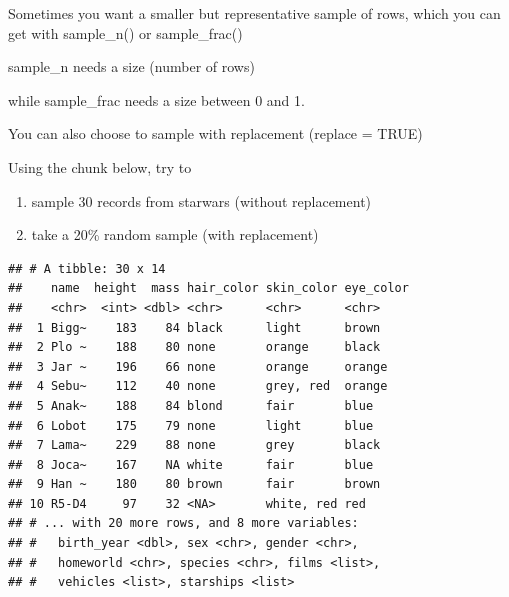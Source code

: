 \documentclass[
]{book}
\newenvironment{Shaded}{\begin{snugshade}}{\end{snugshade}}
\newcommand{\DataTypeTok}[1]{\textcolor[rgb]{0.13,0.29,0.53}{#1}}
\newcommand{\DecValTok}[1]{\textcolor[rgb]{0.00,0.00,0.81}{#1}}
\newcommand{\FloatTok}[1]{\textcolor[rgb]{0.00,0.00,0.81}{#1}}
\newcommand{\KeywordTok}[1]{\textcolor[rgb]{0.13,0.29,0.53}{\textbf{#1}}}
\newcommand{\NormalTok}[1]{#1}
\newcommand{\OperatorTok}[1]{\textcolor[rgb]{0.81,0.36,0.00}{\textbf{#1}}}
\newcommand{\OtherTok}[1]{\textcolor[rgb]{0.56,0.35,0.01}{#1}}
\newcommand{\StringTok}[1]{\textcolor[rgb]{0.31,0.60,0.02}{#1}}
\providecommand{\tightlist}{%
  \setlength{\itemsep}{0pt}\setlength{\parskip}{0pt}}
\begin{document}
Sometimes you want a smaller but representative sample of rows,
which you can get with sample\_n() or sample\_frac()

sample\_n needs a size (number of rows)

while sample\_frac needs a size between 0 and 1.

You can also choose to sample with replacement (replace = TRUE)

Using the chunk below,
try to

\begin{enumerate}
\def\labelenumi{\arabic{enumi}.}
\tightlist
\item
  sample 30 records from starwars (without replacement)
\item
  take a 20\% random sample (with replacement)
\end{enumerate}

\begin{Shaded}
\end{Shaded}

\begin{verbatim}
## # A tibble: 30 x 14
##    name  height  mass hair_color skin_color eye_color
##    <chr>  <int> <dbl> <chr>      <chr>      <chr>    
##  1 Bigg~    183    84 black      light      brown    
##  2 Plo ~    188    80 none       orange     black    
##  3 Jar ~    196    66 none       orange     orange   
##  4 Sebu~    112    40 none       grey, red  orange   
##  5 Anak~    188    84 blond      fair       blue     
##  6 Lobot    175    79 none       light      blue     
##  7 Lama~    229    88 none       grey       black    
##  8 Joca~    167    NA white      fair       blue     
##  9 Han ~    180    80 brown      fair       brown    
## 10 R5-D4     97    32 <NA>       white, red red      
## # ... with 20 more rows, and 8 more variables:
## #   birth_year <dbl>, sex <chr>, gender <chr>,
## #   homeworld <chr>, species <chr>, films <list>,
## #   vehicles <list>, starships <list>
\end{verbatim}

\begin{Shaded}
\end{Shaded}
\end{document}
